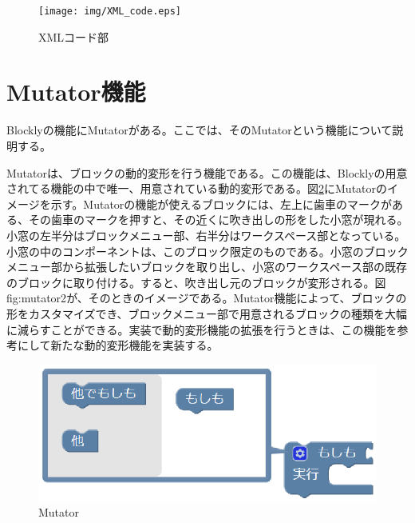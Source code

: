 \documentclass{eniepaper}
\begin{document}
\begin{figure}[h]
\begin{center}
\texttt{[image: img/XML\_code.eps]}
\caption{XMLコード部}%
\label{fig:XML_code}
\end{center}%
\end{figure}%

   \newpage
   
   \section{Mutator機能}
   
Blocklyの機能にMutatorがある。ここでは、そのMutatorという機能について説明する。

Mutatorは、ブロックの動的変形を行う機能である。この機能は、Blocklyの用意されてる機能の中で唯一、用意されている動的変形である。図\ref{fig:mutator1}にMutatorのイメージを示す。Mutatorの機能が使えるブロックには、左上に歯車のマークがある、その歯車のマークを押すと、その近くに吹き出しの形をした小窓が現れる。小窓の左半分はブロックメニュー部、右半分はワークスペース部となっている。小窓の中のコンポーネントは、このブロック限定のものである。小窓のブロックメニュー部から拡張したいブロックを取り出し、小窓のワークスペース部の既存のブロックに取り付ける。すると、吹き出し元のブロックが変形される。図{fig:mutator2}が、そのときのイメージである。Mutator機能によって、ブロックの形をカスタマイズでき、ブロックメニュー部で用意されるブロックの種類を大幅に減らすことができる。実装で動的変形機能の拡張を行うときは、この機能を参考にして新たな動的変形機能を実装する。

\begin{figure}[h]
\begin{center}
\includegraphics[scale=0.5]{img/mutator1.eps}
\caption{Mutator}%
\label{fig:mutator1}
\end{center}%
\end{figure}%
\end{document}
